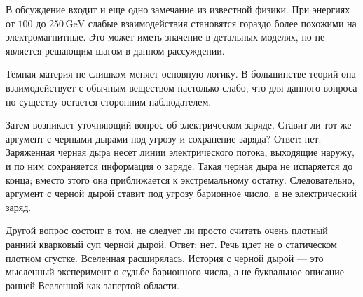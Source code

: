 В обсуждение входит и еще одно замечание из известной физики. При энергиях от \(100\) до \(250\,\mathrm{GeV}\) слабые взаимодействия становятся гораздо более похожими на электромагнитные. Это может иметь значение в детальных моделях, но не является решающим шагом в данном рассуждении.

Темная материя не слишком меняет основную логику. В большинстве теорий она взаимодействует с обычным веществом настолько слабо, что для данного вопроса по существу остается сторонним наблюдателем.

\begin{classroomqa}
\end{classroomqa}

Затем возникает уточняющий вопрос об электрическом заряде. Ставит ли тот же аргумент с черными дырами под угрозу и сохранение заряда? Ответ: нет. Заряженная черная дыра несет линии электрического потока, выходящие наружу, и по ним сохраняется информация о заряде. Такая черная дыра не испаряется до конца; вместо этого она приближается к экстремальному остатку. Следовательно, аргумент с черной дырой ставит под угрозу барионное число, а не электрический заряд.

Другой вопрос состоит в том, не следует ли просто считать очень плотный ранний кварковый суп черной дырой. Ответ: нет. Речь идет не о статическом плотном сгустке. Вселенная расширялась. История с черной дырой — это мысленный эксперимент о судьбе барионного числа, а не буквальное описание ранней Вселенной как запертой области.

\begin{classroomqa}
\end{classroomqa}

